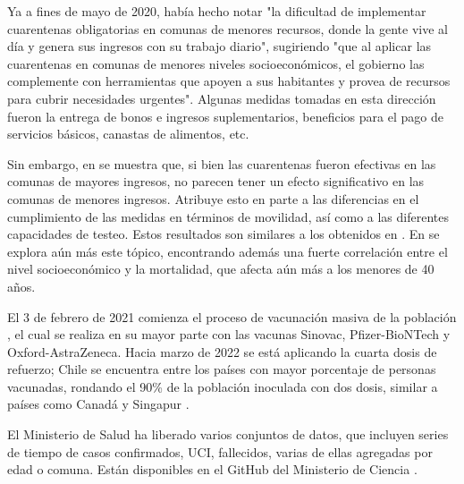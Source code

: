 Ya a fines de mayo de 2020, \cite{Olivares2020} había hecho notar "la dificultad de implementar cuarentenas obligatorias en comunas de menores recursos, donde la gente vive al día y genera sus ingresos con su trabajo diario", sugiriendo "que al aplicar las cuarentenas en comunas de menores niveles socioeconómicos, el gobierno las complemente con herramientas que apoyen a sus habitantes y provea de recursos para cubrir necesidades urgentes". Algunas medidas tomadas en esta dirección fueron la entrega de bonos e ingresos suplementarios, beneficios para el pago de servicios básicos, canastas de alimentos, etc.

Sin embargo, en \cite{Bennett2021} se muestra que, si bien las cuarentenas fueron efectivas en las comunas de mayores ingresos, no parecen tener un efecto significativo en las comunas de menores ingresos. Atribuye esto en parte a las diferencias en el cumplimiento de las medidas en términos de movilidad, así como a las diferentes capacidades de testeo. Estos resultados son similares a los obtenidos en \cite{Gozzi2021}. En \cite{Mena2021} se explora aún más este tópico, encontrando además una fuerte correlación entre el nivel socioeconómico y la mortalidad, que afecta aún más a los menores de 40 años.

El 3 de febrero de 2021 comienza el proceso de vacunación masiva de la población \cite{MINSAL2021}, el cual se realiza en su mayor parte con las vacunas Sinovac, Pfizer-BioNTech y Oxford-AstraZeneca. Hacia marzo de 2022 se está aplicando la cuarta dosis de refuerzo; Chile se encuentra entre los países con mayor porcentaje de personas vacunadas, rondando el 90\% de la población inoculada con dos dosis, similar a países como Canadá y Singapur \cite{Mathieu2021}.

El Ministerio de Salud ha liberado varios conjuntos de datos, que incluyen series de tiempo de casos confirmados, UCI, fallecidos, varias de ellas agregadas por edad o comuna. Están disponibles en el GitHub del Ministerio de Ciencia \cite{MINCIENCIA}. 

